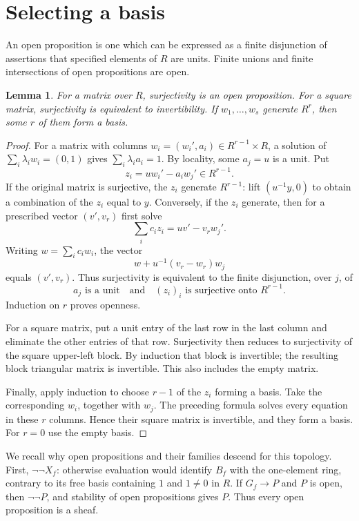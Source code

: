 \documentclass[11pt]{amsart}
\newtheorem{lemma}[theorem]{Lemma}
\theoremstyle{definition}
\begin{document}
\section{Selecting a basis}

An open proposition is one which can be expressed as a finite disjunction
of assertions that specified elements of $R$ are units.
Finite unions and finite intersections of open propositions are open.

\begin{lemma}\label{lem:matrices}
For a matrix over $R$, surjectivity is an open proposition. For a square
matrix, surjectivity is equivalent to invertibility. If
$w_1,\ldots,w_s$ generate $R^r$, then some $r$ of them form a basis.
\end{lemma}
\begin{proof}
For a matrix with columns $w_i=(w_i',a_i)\in R^{r-1}\times R$, a solution
of $\sum_i\lambda_iw_i=(0,1)$ gives $\sum_i\lambda_i a_i=1$.
By locality, some $a_j=u$ is a unit. Put
\[
 z_i=u w_i'-a_iw_j'\in R^{r-1}.
\]
If the original matrix is surjective, the $z_i$ generate $R^{r-1}$:
lift $(u^{-1}y,0)$ to obtain a combination of the $z_i$ equal to $y$.
Conversely, if the $z_i$ generate, then for a prescribed vector
$(v',v_r)$ first solve
\[
 \sum_i c_i z_i=u v'-v_rw_j'.
\]
Writing $w=\sum_i c_iw_i$, the vector
\[
 w+u^{-1}(v_r-w_r)w_j
\]
equals $(v',v_r)$. Thus surjectivity is equivalent to the finite
disjunction, over $j$, of
\[
 a_j\text{ is a unit}\quad\text{and}\quad(z_i)_i
 \text{ is surjective onto }R^{r-1}.
\]
Induction on $r$ proves openness.

For a square matrix, put a unit entry of the last row in the last
column and eliminate the other entries of that row. Surjectivity then
reduces to surjectivity of the square upper-left block. By induction
that block is invertible; the resulting block triangular matrix is
invertible. This also includes the empty matrix.

Finally, apply induction to choose $r-1$ of the $z_i$ forming a basis.
Take the corresponding $w_i$, together with $w_j$. The preceding
formula solves every equation in these $r$ columns. Hence their square
matrix is invertible, and they form a basis. For $r=0$ use the empty basis.
\end{proof}

We recall why open propositions and their families descend for this
topology. First, $\neg\neg X_f$: otherwise evaluation would identify
$B_f$ with the one-element ring, contrary to its free basis containing
$1$ and $1\ne0$ in $R$. If $G_f\to P$ and $P$ is open, then
$\neg\neg P$, and stability of open propositions gives $P$.
Thus every open proposition is a sheaf.
\end{document}
